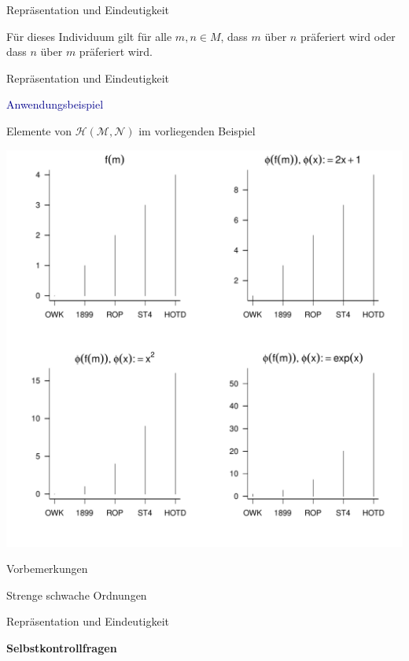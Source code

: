 \documentclass[
  8pt,
  ignorenonframetext,
]{beamer}
\begin{document}
\begin{frame}{Repräsentation und Eindeutigkeit}
\flushleft
\footnotesize
\vspace{1mm}

Für dieses Individuum gilt für alle \(m,n\in M\), dass \(m\) über \(n\)
präferiert wird oder dass \(n\) über \(m\) präferiert wird.
\end{frame}

\begin{frame}{Repräsentation und Eindeutigkeit}
\protect\hypertarget{repruxe4sentation-und-eindeutigkeit-9}{}
\vspace{3mm}

\textcolor{darkblue}{Anwendungsbeispiel} \footnotesize

Elemente von \(\mathcal{H}(\mathcal{M},\mathcal{N})\) im vorliegenden
Beispiel

\begin{center}\includegraphics[width=0.62\linewidth]{8_Abbildungen/pfm_8_anwendungsbeispiel} \end{center}
\end{frame}

\begin{frame}{}
\protect\hypertarget{section-5}{}
\Large
{}
\vfill

Vorbemerkungen

Strenge schwache Ordnungen

Repräsentation und Eindeutigkeit

\textbf{Selbstkontrollfragen} \vfill
\end{frame}
\end{document}
